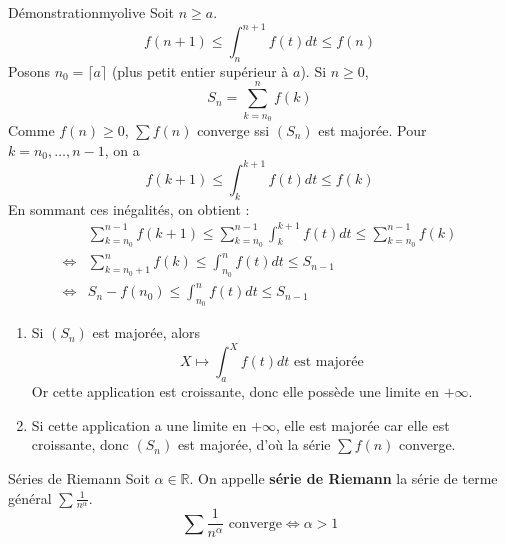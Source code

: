     \begin{demo}{Démonstration}{myolive}
        Soit $n \geq a$.
        \[ f(n+1)  \leq \int_{n}^{n+1} f(t)dt \leq f(n) \] 
        Posons $n_0 = \lceil a \rceil$ (plus petit entier supérieur à $a$). Si $n \geq 0$, 
        \[ S_n = \sum_{k=n_0}^{n} f(k) \] 
        Comme $f(n) \geq 0$, $\sum f(n)$ converge ssi $(S_n)$ est majorée. Pour $k = n_0, \ldots, n-1$, on a 
        \[ f(k+1) \leq \int_{k}^{k+1} f(t)dt \leq f(k) \]
        En sommant ces inégalités, on obtient :
        \begin{align*}
             & \sum_{k=n_0}^{n-1} f(k+1) \leq \sum_{k=n_0}^{n-1} \int_{k}^{k+1} f(t)dt \leq \sum_{k=n_0}^{n-1} f(k) \\
        \iff & \sum_{k=n_0 + 1}^{n} f(k) \leq \int_{n_0}^{n} f(t)dt \leq S_{n-1} \\
        \iff & S_n - f(n_0) \leq \int_{n_0}^{n} f(t)dt \leq S_{n-1} 
        \end{align*}
        \begin{enumerate}
            \item Si $(S_n)$ est majorée, alors 
            \[ X \longmapsto \int_{a}^{X} f(t)dt \text{ est majorée} \] 
            Or cette application est croissante, donc elle possède une limite en $+\infty$.
            \item Si cette application a une limite en $+\infty$, elle est majorée car elle est croissante, donc $(S_n)$ est majorée, d’où la série $\sum f(n)$ converge.
        \end{enumerate}
    \end{demo}

    \begin{prop}{Séries de Riemann}{}
        Soit $\alpha \in \mathbb{R}$. On appelle \textbf{série de Riemann} la série de terme général $\sum \frac{1}{n^{\alpha}}$. 
        \[ \sum \frac{1}{n^{\alpha}} \text{ converge} \iff \alpha > 1 \] 
    \end{prop}


